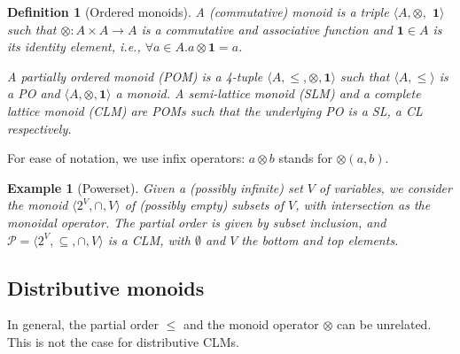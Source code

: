 \documentclass[a4paper]{elsarticle}
\newtheorem{definition}{Definition}
\newtheorem{example}{Example}
\newcommand{\monop}{\otimes}
\newcommand{\1}{\mathbf{1}}
\begin{document}
%
%

\begin{definition}[Ordered monoids]\label{defn:clm}
	A (commutative) monoid is a triple
	$\langle A, \monop,$ $\1 \rangle$ such that $\monop: A \times A \rightarrow A$ is
	a commutative and associative function and $\1 \in A$ is its \emph{identity} element,
	i.e., $\forall a \in A. a \monop \1 = a$.
	
	A partially ordered monoid (POM) is a 4-tuple
	$\langle A, \leq, \monop, \1 \rangle$ such that 	
	$\langle A, \leq \rangle$ is a PO and $\langle A, \monop, \1 \rangle$ a monoid.
	A semi-lattice monoid (SLM) and a complete lattice monoid (CLM) are 
	POMs such that the underlying PO is a SL, a CL respectively.
\end{definition}

For ease of notation, we use infix operators: $a \monop b$ stands for $\monop(a,b)$.

\begin{example}[Powerset]\label{ex:powerset}
	Given a (possibly infinite) set $V$ of variables, we consider
	the monoid $\langle 2^V, \cap, V \rangle$
	of (possibly empty) subsets of $V$, with intersection as the monoidal operator.
	The partial order is given by subset inclusion, and 
	$\mathcal{P} = \langle 2^V, \subseteq, \cap, V \rangle$
	is a CLM, with $\emptyset$ and $V$ the bottom and top elements. %
\end{example}

\subsection{Distributive monoids}

In general, the partial order $\leq$ and the monoid operator $\otimes$ can be unrelated.
This is not the case for distributive CLMs.
\end{document}
